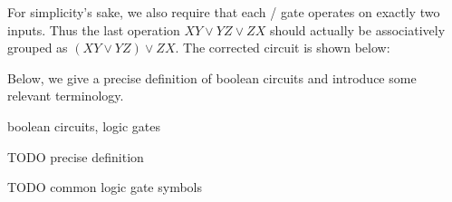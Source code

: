 {  For simplicity's sake, we also require that each \AND/\OR{} gate operates on
  exactly two inputs.  Thus the last \OR{} operation \(XY∨YZ∨ZX\) should
  actually be associatively grouped as \((XY∨YZ)∨ZX\).  The corrected circuit
  is shown below:

  \begin{center}
  \end{center}

}


Below, we give a precise definition of boolean circuits and introduce some
relevant terminology.

\begin{definition}{boolean circuits, logic gates}{}
  
  TODO precise definition

  TODO common logic gate symbols

\end{definition}



